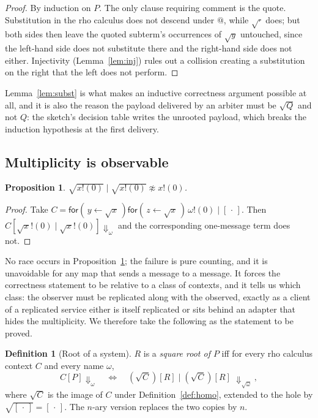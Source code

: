 \documentclass[11pt]{article}
\newtheorem{proposition}[theorem]{Proposition}
\theoremstyle{definition}
\newtheorem{definition}[theorem]{Definition}
\newcommand{\rhoc}{rho calculus}
\newcommand{\In}[2]{\mathsf{for}(\,#1 \leftarrow #2\,)}
\newcommand{\rt}[1]{\sqrt{#1}}
\newcommand{\wbarb}[1]{\Downarrow_{#1}}
\begin{document}
\begin{proof}
By induction on $P$. The only clause requiring comment is the quote. Substitution in the \rhoc{} does not descend under $@$, while $\rt{\cdot}$ does; but both sides then leave the quoted subterm's occurrences of $\rt{y}$ untouched, since the left-hand side does not substitute there and the right-hand side does not either. Injectivity (Lemma~\ref{lem:inj}) rules out a collision creating a substitution on the right that the left does not perform.
\end{proof}

Lemma~\ref{lem:subst} is what makes an inductive correctness argument possible at all, and it is also the reason the payload delivered by an arbiter must be $\rt{Q}$ and not $Q$: the sketch's decision table writes the unrooted payload, which breaks the induction hypothesis at the first delivery.

\subsection{Multiplicity is observable}

\begin{proposition}\label{prop:mult}
$\rt{x!(0)} \mid \rt{x!(0)} \not\approx x!(0)$.
\end{proposition}

\begin{proof}
Take $C = \In{y}{\rt{x}}\In{z}{\rt{x}}\,\omega!(0) \mid [\,\cdot\,]$. Then $C[\rt{x}!(0) \mid \rt{x}!(0)] \wbarb{\omega}$ and the corresponding one-message term does not.
\end{proof}

No race occurs in Proposition~\ref{prop:mult}; the failure is pure counting, and it is unavoidable for any map that sends a message to a message. It forces the correctness statement to be relative to a class of contexts, and it tells us which class: the observer must be replicated along with the observed, exactly as a client of a replicated service either is itself replicated or sits behind an adapter that hides the multiplicity. We therefore take the following as the statement to be proved.

\begin{definition}[Root of a system]\label{def:sysroot}
$R$ is a \emph{square root of $P$} iff for every \rhoc{} context $C$ and every name $\omega$,
\[
  C[P] \wbarb{\omega}
  \quad\Longleftrightarrow\quad
  (\rt{C})[R] \mid (\rt{C})[R] \;\wbarb{\rt{\omega}} ,
\]
where $\rt{C}$ is the image of $C$ under Definition~\ref{def:homo}, extended to the hole by $\rt{[\,\cdot\,]} = [\,\cdot\,]$. The $n$-ary version replaces the two copies by $n$.
\end{definition}
\end{document}
